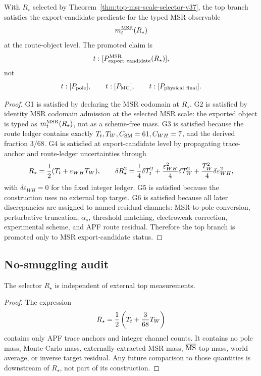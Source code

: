 \begin{corollary}
With \(R_\star\) selected by Theorem~\ref{thm:top-msr-scale-selector-v37}, the top branch satisfies the export-candidate predicate for the typed MSR observable
\[
        m_t^{\rm MSR}(R_\star)
\]
at the route-object level.  The promoted claim is
\[
        t:[P_{\rm export\ candidate}^{\rm MSR}(R_\star)],
\]
not
\[
        t:[P_{\rm pole}],\qquad
        t:[P_{\rm MC}],\qquad
        t:[P_{\rm physical\ final}].
\]
\end{corollary}

\begin{proof}
G1 is satisfied by declaring the MSR codomain at \(R_\star\).  G2 is satisfied by identity MSR codomain admission at the selected MSR scale: the exported object is typed as \(m_t^{\rm MSR}(R_\star)\), not as a scheme-free mass.  G3 is satisfied because the route ledger contains exactly \(T_t,T_W,C_{\rm SM}=61,C_{WH}=7\), and the derived fraction \(3/68\).  G4 is satisfied at export-candidate level by propagating trace-anchor and route-ledger uncertainties through
\[
        R_\star={1\over2}(T_t+\varepsilon_{WH}T_W),
        \qquad
        \delta R_\star^2={1\over4}\delta T_t^2
        +{\varepsilon_{WH}^2\over4}\delta T_W^2
        +{T_W^2\over4}\delta\varepsilon_{WH}^2,
\]
with \(\delta\varepsilon_{WH}=0\) for the fixed integer ledger.  G5 is satisfied because the construction uses no external top target.  G6 is satisfied because all later discrepancies are assigned to named residual channels: MSR-to-pole conversion, perturbative truncation, \(\alpha_s\), threshold matching, electroweak correction, experimental scheme, and APF route residual.  Therefore the top branch is promoted only to MSR export-candidate status.  \qedhere
\end{proof}

\subsection{No-smuggling audit}

\begin{lemma}
The selector \(R_\star\) is independent of external top measurements.
\end{lemma}

\begin{proof}
The expression
\[
        R_\star={1\over2}\left(T_t+{3\over68}T_W\right)
\]
contains only APF trace anchors and integer channel counts.  It contains no pole mass, Monte-Carlo mass, externally extracted MSR mass, \(\overline{\rm MS}\) top mass, world average, or inverse target residual.  Any future comparison to those quantities is downstream of \(R_\star\), not part of its construction.  \qedhere
\end{proof}

